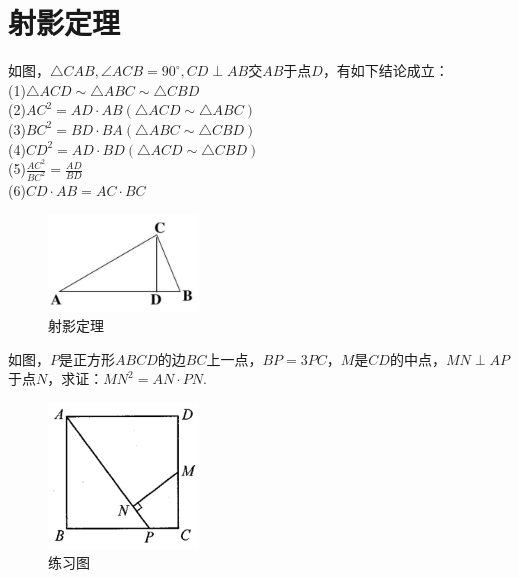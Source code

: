 \documentclass{ecnuthesis}
\begin{document}
\section{射影定理}
\begin{model}
    如图，$\triangle CAB,\angle ACB=90^\circ,CD\perp AB$交$AB$于点$D$，有如下结论成立：\\
    (1)$\triangle ACD \sim \triangle ABC \sim \triangle CBD$ \\
    (2)$AC^2 = AD·AB(\triangle ACD \sim \triangle ABC)$ \\
    (3)$BC^2 = BD·BA(\triangle ABC \sim \triangle CBD)$ \\
    (4)$CD^2 = AD·BD(\triangle ACD \sim \triangle CBD)$ \\
    (5)$\frac{AC^2}{BC^2}=\frac{AD}{BD}$ \\
    (6)$CD·AB = AC·BC$
\end{model}
\begin{figure}[H]
\centering
\includegraphics[width=4cm]{picture/812.png}
\caption{射影定理}
\end{figure}
\begin{problem}
    如图，$P$是正方形$ABCD$的边$BC$上一点，$BP=3PC$，$M$是$CD$的中点，$MN\perp AP$于点$N$，求证：$MN^2=AN·PN.$
\end{problem}
\begin{figure}[H]
\centering
\includegraphics[width=4cm]{picture/813.png}
\caption{练习图}
\end{figure}
\clearpage
\end{document}
